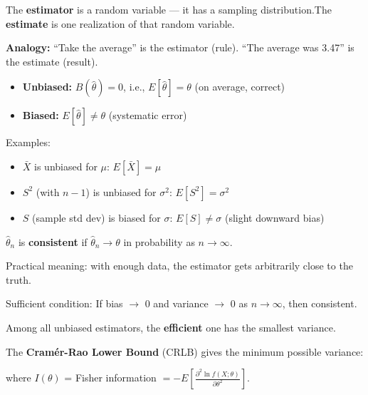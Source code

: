 
The \textbf{estimator} is a random variable — it has a sampling distribution.\PSbr{}The \textbf{estimate} is one realization of that random variable.

\textbf{Analogy:} ``Take the average'' is the estimator (rule). ``The average was 3.47'' is the estimate (result).




\begin{itemize}
\tightlist
\item
  \textbf{Unbiased:} $B(\hat{\theta}) = 0$, i.e., $E[\hat{\theta}] = \theta$ (on average, correct)
\item
  \textbf{Biased:} $E[\hat{\theta}] \ne \theta$ (systematic error)
\end{itemize}

Examples:

\begin{itemize}
\tightlist
\item
  $\bar{X}$ is unbiased for $\mu$: $E[\bar{X}] = \mu$ \PSyes{}
\item
  $S^{2}$ (with $n-1$) is unbiased for $\sigma^{2}$: $E[S^{2}] = \sigma^{2}$ \PSyes{}
\item
  $S$ (sample std dev) is biased for $\sigma$: $E[S] \ne \sigma$ (slight downward bias)
\end{itemize}


$\hat{\theta}_{n}$ is \textbf{consistent} if $\hat{\theta}_{n} \to \theta$ in probability as $n \to \infty$.

Practical meaning: with enough data, the estimator gets arbitrarily close to the truth.

Sufficient condition: If bias \ensuremath{\to} 0 and variance \ensuremath{\to} 0 as $n \to \infty$, then consistent.


Among all unbiased estimators, the \textbf{efficient} one has the smallest variance.

The \textbf{Cramér-Rao Lower Bound} (CRLB) gives the minimum possible variance:

where $I(\theta)$ = Fisher information $= -E\left[\frac{\partial^{2}\ln f(X; \theta)}{\partial \theta^{2}}\right]$.

